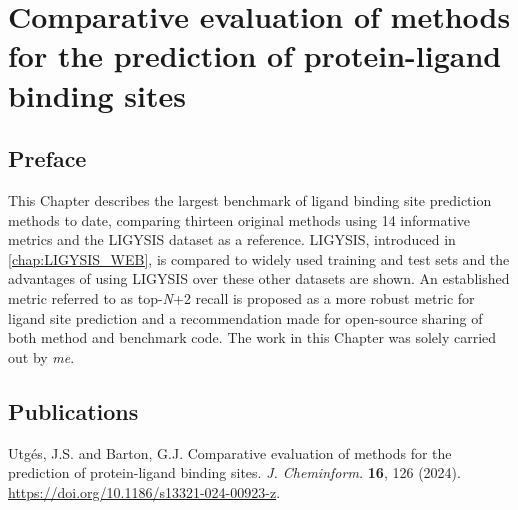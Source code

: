 \chapter{Comparative evaluation of methods for the prediction of protein-ligand binding sites}
\label{chap:LBS_COMP}

\section*{Preface}

This Chapter describes the largest benchmark of ligand binding site prediction methods to date, comparing thirteen original methods using 14 informative metrics and the LIGYSIS dataset as a reference. LIGYSIS, introduced in \autoref{chap:LIGYSIS_WEB}, is compared to widely used training and test sets and the advantages of using LIGYSIS over these other datasets are shown. An established metric referred to as top-\textit{N}+2 recall is proposed as a more robust metric for ligand site prediction and a recommendation made for open-source sharing of both method and benchmark code. The work in this Chapter was solely carried out by \textit{me}.

\section*{Publications}

Utgés, J.S. and Barton, G.J. Comparative evaluation of methods for the prediction of protein-ligand binding sites. \textit{J. Cheminform.} \textbf{16}, 126 (2024). \url{https://doi.org/10.1186/s13321-024-00923-z}.



